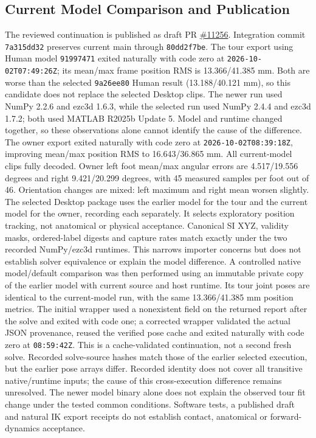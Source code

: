 \documentclass[11pt,a4paper]{article}
\begin{document}
\subsection{Current Model Comparison and Publication}
The reviewed continuation is published as draft PR
\href{https://github.com/D-sorganization/UpstreamDrift/pull/11256}{\#11256}.
Integration commit \texttt{7a315dd32} preserves current main through
\texttt{80dd2f7be}. The tour export using Human model \texttt{91997471}
exited naturally with code zero at \texttt{2026-10-02T07:49:26Z}; its
mean/max frame position RMS is 13.366/41.385 mm. Both are worse than the
selected \texttt{9a26ee80} Human result (13.188/40.121 mm), so this candidate
does not replace the selected Desktop clips. The newer run used NumPy 2.2.6
and ezc3d 1.6.3, while the selected run used NumPy 2.4.4 and ezc3d 1.7.2;
both used MATLAB R2025b Update 5. Model and runtime changed together, so
these observations alone cannot identify the cause of the difference.
The owner export exited naturally with code zero at
\texttt{2026-10-02T08:39:18Z}, improving mean/max position RMS to
16.643/36.865 mm. All current-model clips fully decoded. Owner left foot
mean/max angular errors are 4.517/19.556 degrees and right 9.421/20.299
degrees, with 45 measured samples per foot out of 46. Orientation changes
are mixed: left maximum and right mean worsen slightly. The selected Desktop
package uses the earlier model for the tour and the current model for the
owner, recording each separately. It selects exploratory position tracking,
not anatomical or physical acceptance. Canonical SI XYZ, validity masks,
ordered-label digests and capture rates match exactly under the two recorded
NumPy/ezc3d runtimes. This narrows importer concerns but does not establish
solver equivalence or explain the model difference. A controlled native
model/default comparison was then performed using an immutable private copy of
the earlier model with current source and host runtime. Its tour joint poses
are identical to the current-model run, with the same 13.366/41.385 mm
position metrics. The initial wrapper used a nonexistent field on the returned
report after the solve and exited with code one; a corrected wrapper validated
the actual JSON provenance, reused the verified pose cache and exited naturally
with code zero at \texttt{08:59:42Z}. This is a cache-validated continuation,
not a second fresh solve. Recorded solve-source hashes match those of the
earlier selected execution, but the earlier pose arrays differ. Recorded
identity does not cover all transitive native/runtime inputs; the cause of
this cross-execution difference remains unresolved. The newer model binary
alone does not explain the observed tour fit change under the tested common
conditions. Software tests, a published draft and natural IK export
receipts do not establish contact, anatomical or forward-dynamics acceptance.
\end{document}
